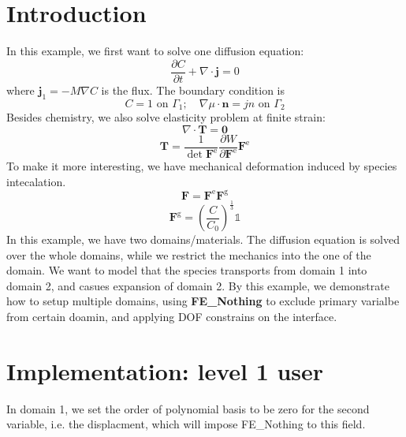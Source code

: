 \hypertarget{growth_Introduction}{}\section{Introduction}\label{growth_Introduction}
In this example, we first want to solve one diffusion equation\-: \[ \frac{\partial C}{\partial t}+\nabla\cdot\boldsymbol{j}=0 \] where $\boldsymbol{j}_1=-M\nabla C$ is the flux. The boundary condition is \[ C=1 \text{ on }\Gamma_1; \quad \nabla \mu\cdot\boldsymbol{n}=jn \text{ on }\Gamma_2 \] Besides chemistry, we also solve elasticity problem at finite strain\-: \[ \nabla\cdot\boldsymbol{T} = \boldsymbol{0} \] \[ \boldsymbol{T}= \frac{1}{\det{\boldsymbol{F}^{\text{e}}}}\frac{\partial W}{\partial \boldsymbol{F}^{\text{e}}}\boldsymbol{F}^{\text{e}} \] To make it more interesting, we have mechanical deformation induced by species intecalation. \[ \boldsymbol{F}=\boldsymbol{F}^{\text{e}}\boldsymbol{F}^{\text{g}} \] \[ \boldsymbol{F}^{\text{g}}=\left(\frac{C}{C_\text{0}}\right)^{\frac{1}{3}}\mathbb{1} \] In this example, we have two domains/materials. The diffusion equation is solved over the whole domains, while we restrict the mechanics into the one of the domain. We want to model that the species transports from domain 1 into domain 2, and casues expansion of domain 2. By this example, we demonstrate how to setup multiple domains, using {\bfseries F\-E\-\_\-\-Nothing} to exclude primary varialbe from certain doamin, and applying D\-O\-F constrains on the interface.

 \hypertarget{growth_imple}{}\section{Implementation\-: level 1 user}\label{growth_imple}
In domain 1, we set the order of polynomial basis to be zero for the second variable, i.\-e. the displacment, which will impose F\-E\-\_\-\-Nothing to this field.

